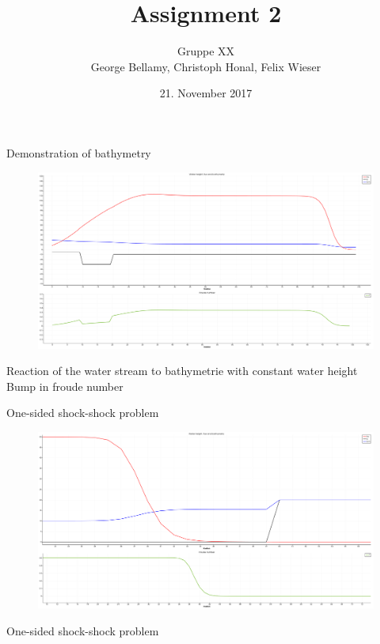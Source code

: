 \documentclass[shortpres]{beamer}
\title[{Tsunami simulation}]{Assignment 2}
\author[Bellamy, Honal, Wieser]{Gruppe XX\\George Bellamy, Christoph Honal, Felix Wieser\\\vspace{10pt}{\small Bachelorpraktikum}}
\institute[TU M\"unchen]{Technical University of Munich}
\date{21. November 2017}
\newcommand{\imgfullscale}{0.75}
\begin{document}
\maketitle

\begin{frame}{Demonstration of bathymetry}
	\begin{figure}
		\includegraphics[clip, width=\imgfullscale\linewidth]{img/Bathymetry_simple.png}
	\end{figure}
	Reaction of the water stream to bathymetrie with constant water height\\
	Bump in froude number
\end{frame}

\begin{frame}{One-sided shock-shock problem}
	\begin{figure}
		\includegraphics[clip, width=\imgfullscale\linewidth]{img/Shock_Wall.png}
	\end{figure}
	One-sided shock-shock problem
\end{frame}
\end{document}
